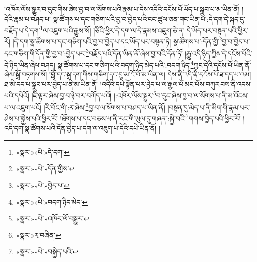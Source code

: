 །འཁོར་ལོས་སྒྱུར་བ་དུང་གིས་ཞེས་བྱ་བ་ལ་སོགས་པའི་རྣམ་པ་དེས་འདིའི་དངོས་པོ་ཡོད་པ་སྒྲུབ་པ་མ་ཡིན་ནོ། །དེའི་རྣམ་པ་བཤད་པ། སྣ་ཚོགས་པ་དང་གཅིག་པའི་བྱ་བ་བྱེད་པའི་ངང་ཚུལ་ཅན་གང་ཡིན་པ་:དེ་དག་དེ་སྐད་དུ་བརྗོད་པ་དེ་དག་\footnote{«སྣར་»«པེ་»དེ་དག་}ལ་འཇུག་པའི་རྒྱུས་སོ། །ཅིའི་ཕྱིར་དེ་དག་ལ་དེ་རྣམས་འཇུག་ཅེ་ན། དེ་ཡོད་པར་བསྟན་པའི་ཕྱིར་རོ། །དེ་དག་སྣ་ཚོགས་པ་དང་གཅིག་པའི་བྱ་བ་བྱེད་པ་དང་ཡོད་པར་བསྟན་ཏེ། སྣ་ཚོགས་པ་:དོན་གྱི་\footnote{«སྣར་»«པེ་»དོན་གྱིས་}བྱ་བ་བྱེད་པ་དང་གཅིག་གི་དོན་གྱི་བྱ་བ་:བྱེད་པར་\footnote{«སྣར་»«པེ་»བྱེད་པ་}བརྗོད་པའི་དོན་ཡིན་ནོ་ཞེས་བྱ་བའི་དོན་ཏོ། །རྒྱུ་འདི་ཉིད་ཀྱིས་དེ་དངོས་པོའི་དེ་ཉིད་ཡིན་ཞེས་བཤད། སྣ་ཚོགས་པ་དང་གཅིག་པའི་བདག་ཉིད་མེད་པའི་:བདག་ཉིད་\footnote{«སྣར་»«པེ་»བདག་ཉིད་མེད་}ཀྱང་དེའི་དངོས་པོ་ཡིན་ནོ་ཞེས་སྒྲོ་བཏགས་སོ། །བློ་དང་སྒྲ་དག་གིས་གཅིག་དང་དུ་མ་ངོ་བོ་མ་ཡིན་ལ། དེས་ནི་འདི་ནི་དངོས་པོ་ཐ་དད་པ་འམ། ཐ་མི་དད་པ་སྒྲུབ་པར་བྱེད་པ་ནི་མ་ཡིན་ནོ། །འདིའི་དཔེ་སྟོན་པར་བྱེད་པ་ལ་རྒྱལ་པོ་མང་པོས་བཀུར་བས་ནི་འདས་པའི་དཔེའོ། །ཇི་ལྟར་ཞེས་བྱ་བ་ཉེ་བར་བཀོད་པའོ། །:འཁོར་ལོས་སྒྱུར་\footnote{«སྣར་»«པེ་»འཁོར་ལོ་བསྒྱུར་}བ་དུང་ཞེས་བྱ་བ་ལ་སོགས་པ་ནི་མ་འོངས་པ་ལ་འཇུག་པའོ། །རི་བོང་གི་:རྭ་ཞེས་\footnote{«སྣར་»རྭ་བཞིན་}བྱ་བ་ལ་སོགས་པ་བཤད་པ་ཡིན་ནོ། །བསྟན་དུ་མེད་པ་ནི་མིག་གི་རྣམ་པར་ཤེས་པ་སྐྱེས་པའི་ཕྱིར་རོ། །ཐོགས་པ་དང་བཅས་པ་ནི་རང་གི་ཡུལ་དུ་གཞན་:སྐྱེ་བའི་\footnote{«སྣར་»«པེ་»བསྐྱེད་པའི་}གགས་བྱེད་པའི་ཕྱིར་རོ། །འདི་དག་སྣ་ཚོགས་པའི་དོན་བྱེད་པ་དག་ལ་འཇུག་པ་དེའི་དཔེ་ཡིན་ནོ། །
